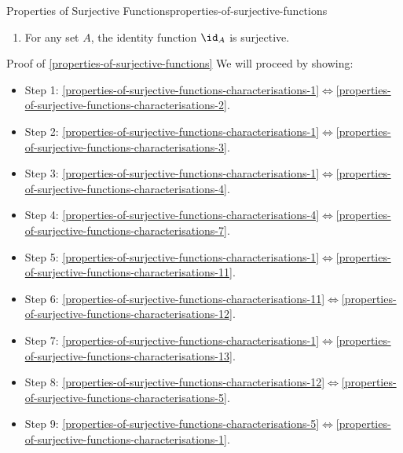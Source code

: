 \begin{proposition}{Properties of Surjective Functions}{properties-of-surjective-functions}
\begin{enumerate}
\begin{enumerate}
                \item\label{properties-of-surjective-functions-interaction-with-composition-d}The class of surjective functions does not satisfy the two-out-of-three property of \cref{TODO}.
            \end{enumerate}
        \item\label{properties-of-surjective-functions-interaction-with-identities}For any set $A$, the identity function $\id_{A}$ is surjective.
    \end{enumerate}
\end{proposition}
\begin{Proof}{Proof of \cref{properties-of-surjective-functions}}%
    We will proceed by showing:
    \begin{itemize}
        \item Step 1: \cref{properties-of-surjective-functions-characterisations-1}$\iff$\cref{properties-of-surjective-functions-characterisations-2}.
        \item Step 2: \cref{properties-of-surjective-functions-characterisations-1}$\iff$\cref{properties-of-surjective-functions-characterisations-3}.
        \item Step 3: \cref{properties-of-surjective-functions-characterisations-1}$\iff$\cref{properties-of-surjective-functions-characterisations-4}.
        \item Step 4: \cref{properties-of-surjective-functions-characterisations-4}$\iff$\cref{properties-of-surjective-functions-characterisations-7}.
        \item Step 5: \cref{properties-of-surjective-functions-characterisations-1}$\iff$\cref{properties-of-surjective-functions-characterisations-11}.
        \item Step 6: \cref{properties-of-surjective-functions-characterisations-11}$\iff$\cref{properties-of-surjective-functions-characterisations-12}.
        \item Step 7: \cref{properties-of-surjective-functions-characterisations-1}$\iff$\cref{properties-of-surjective-functions-characterisations-13}.
        \item Step 8: \cref{properties-of-surjective-functions-characterisations-12}$\iff$\cref{properties-of-surjective-functions-characterisations-5}.
        \item Step 9: \cref{properties-of-surjective-functions-characterisations-5}$\iff$\cref{properties-of-surjective-functions-characterisations-1}.

\end{itemize}
\end{Proof}
